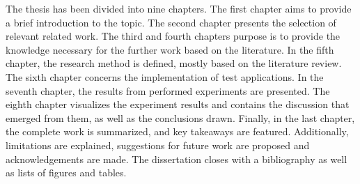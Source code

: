 The thesis has been divided into nine chapters. The first chapter aims to provide a brief introduction to the topic. The second chapter presents the selection of relevant related work. The third and fourth chapters purpose is to provide the knowledge necessary for the further work based on the literature. In the fifth chapter, the research method is defined, mostly based on the literature review. The sixth chapter concerns the implementation of test applications. In the seventh chapter, the results from performed experiments are presented. The eighth chapter visualizes the experiment results and contains the discussion that emerged from them, as well as the conclusions drawn. Finally, in the last chapter, the complete work is summarized, and key takeaways are featured. Additionally, limitations are explained, suggestions for future work are proposed and acknowledgements are made. The dissertation closes with a bibliography as well as lists of figures and tables.

\clearpage
